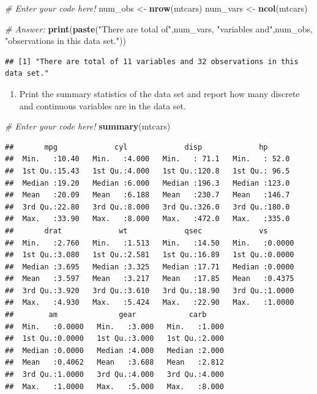 \documentclass[
]{article}
\newenvironment{Shaded}{\begin{snugshade}}{\end{snugshade}}
\newcommand{\CommentTok}[1]{\textcolor[rgb]{0.56,0.35,0.01}{\textit{#1}}}
\newcommand{\FunctionTok}[1]{\textcolor[rgb]{0.13,0.29,0.53}{\textbf{#1}}}
\newcommand{\NormalTok}[1]{#1}
\newcommand{\OtherTok}[1]{\textcolor[rgb]{0.56,0.35,0.01}{#1}}
\newcommand{\StringTok}[1]{\textcolor[rgb]{0.31,0.60,0.02}{#1}}
\providecommand{\tightlist}{%
  \setlength{\itemsep}{0pt}\setlength{\parskip}{0pt}}
\begin{document}
\begin{Shaded}
\begin{Highlighting}[]
\CommentTok{\# Enter your code here!}
\NormalTok{num\_obs }\OtherTok{\textless{}{-}} \FunctionTok{nrow}\NormalTok{(mtcars)}
\NormalTok{num\_vars }\OtherTok{\textless{}{-}} \FunctionTok{ncol}\NormalTok{(mtcars)}

\CommentTok{\# Answer:}
\FunctionTok{print}\NormalTok{(}\FunctionTok{paste}\NormalTok{(}\StringTok{"There are total of"}\NormalTok{,num\_vars, }\StringTok{"variables and"}\NormalTok{,num\_obs, }\StringTok{"observations in this data set."}\NormalTok{))}
\end{Highlighting}
\end{Shaded}

\begin{verbatim}
## [1] "There are total of 11 variables and 32 observations in this data set."
\end{verbatim}

\begin{enumerate}
\def\labelenumi{\alph{enumi}.}
\setcounter{enumi}{1}
\tightlist
\item
  Print the summary statistics of the data set and report how many
  discrete and continuous variables are in the data set.
\end{enumerate}

\begin{Shaded}
\begin{Highlighting}[]
\CommentTok{\# Enter your code here!}
\FunctionTok{summary}\NormalTok{(mtcars)}
\end{Highlighting}
\end{Shaded}

\begin{verbatim}
##       mpg             cyl             disp             hp       
##  Min.   :10.40   Min.   :4.000   Min.   : 71.1   Min.   : 52.0  
##  1st Qu.:15.43   1st Qu.:4.000   1st Qu.:120.8   1st Qu.: 96.5  
##  Median :19.20   Median :6.000   Median :196.3   Median :123.0  
##  Mean   :20.09   Mean   :6.188   Mean   :230.7   Mean   :146.7  
##  3rd Qu.:22.80   3rd Qu.:8.000   3rd Qu.:326.0   3rd Qu.:180.0  
##  Max.   :33.90   Max.   :8.000   Max.   :472.0   Max.   :335.0  
##       drat             wt             qsec             vs        
##  Min.   :2.760   Min.   :1.513   Min.   :14.50   Min.   :0.0000  
##  1st Qu.:3.080   1st Qu.:2.581   1st Qu.:16.89   1st Qu.:0.0000  
##  Median :3.695   Median :3.325   Median :17.71   Median :0.0000  
##  Mean   :3.597   Mean   :3.217   Mean   :17.85   Mean   :0.4375  
##  3rd Qu.:3.920   3rd Qu.:3.610   3rd Qu.:18.90   3rd Qu.:1.0000  
##  Max.   :4.930   Max.   :5.424   Max.   :22.90   Max.   :1.0000  
##        am              gear            carb      
##  Min.   :0.0000   Min.   :3.000   Min.   :1.000  
##  1st Qu.:0.0000   1st Qu.:3.000   1st Qu.:2.000  
##  Median :0.0000   Median :4.000   Median :2.000  
##  Mean   :0.4062   Mean   :3.688   Mean   :2.812  
##  3rd Qu.:1.0000   3rd Qu.:4.000   3rd Qu.:4.000  
##  Max.   :1.0000   Max.   :5.000   Max.   :8.000
\end{verbatim}
\end{document}
